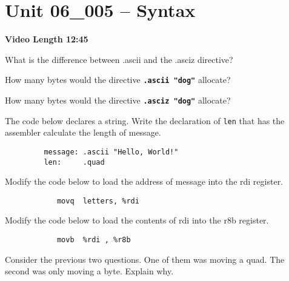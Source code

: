 \documentclass[letterpaper,12pt]{exam}
\newcommand{\unit}{Unit 06}
\begin{document}

\section*{\unit\_005 -- Syntax}
\par{\selectfont\textbf{Video Length 12:45}}
\begin{questions}

\begin{samepage}
    \question What is the difference between .ascii and the .asciz directive?
    \vspace{5mm}
\end{samepage}
\begin{samepage}
    \question How many bytes would the directive \textbf{\texttt{.ascii "dog"}} allocate?
    \vspace{5mm}
\end{samepage}
\begin{samepage}
    \question How many bytes would the directive \textbf{\texttt{.asciz "dog"}} allocate?
    \vspace{5mm}
\end{samepage}
\par
\begin{samepage}
    \question The code below declares a string.  Write the declaration of \texttt{len} that has the assembler calculate the length of message.
    \begin{verbatim}
         message: .ascii "Hello, World!"
         len:     .quad   
    \end{verbatim}        
    \vspace{5mm}
\end{samepage}
\par
 \begin{samepage}
     \question Modify the code below to load the address of message into the rdi register.
        \begin{verbatim}
            movq  letters, %rdi
        \end{verbatim}
     \vspace{5mm}
 \end{samepage}
 \par
 \begin{samepage}
     \question Modify the code below to load the contents of rdi into the r8b register.
        \begin{verbatim}
            movb  %rdi , %r8b
        \end{verbatim}
     \vspace{5mm}
 \end{samepage}
 \par 
 \question Consider the previous two questions.  One of them was moving a quad.  The second was only moving a byte.  Explain why.
\vspace{5mm}


\end{questions}
\end{document}
